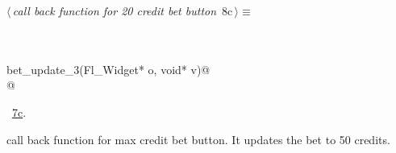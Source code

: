 \documentclass{article}
\renewcommand{\NWtarget}[2]{\hypertarget{#1}{#2}}
\renewcommand{\NWlink}[2]{\hyperlink{#1}{#2}}
\begin{document}
\begin{flushleft} \small
\begin{minipage}{\linewidth}\label{scrap12}\raggedright\small
\NWtarget{nuweb8c}{} $\langle\,${\it call back function for 20 credit bet button}\nobreak\ {\footnotesize {8c}}$\,\rangle\equiv$
\vspace{-1ex}
\begin{list}{}{} \item
\mbox{}\verb@@\\
\mbox{}\verb@@\\
\mbox{}\verb@void bet_update_3(Fl_Widget* o, void* v)@\\
\mbox{}@\\
\mbox{}\verb@@{\NWsep}
\end{list}
\vspace{-1.5ex}
\footnotesize
\begin{list}{}{\setlength{\itemsep}{-\parsep}\setlength{\itemindent}{-\leftmargin}}
\item \NWtxtMacroRefIn\ \NWlink{nuweb7c}{7c}.

\item{}
\end{list}
\end{minipage}\vspace{4ex}
\end{flushleft}
call back function for max credit bet button. It updates the bet to 50 credits.
\end{document}
